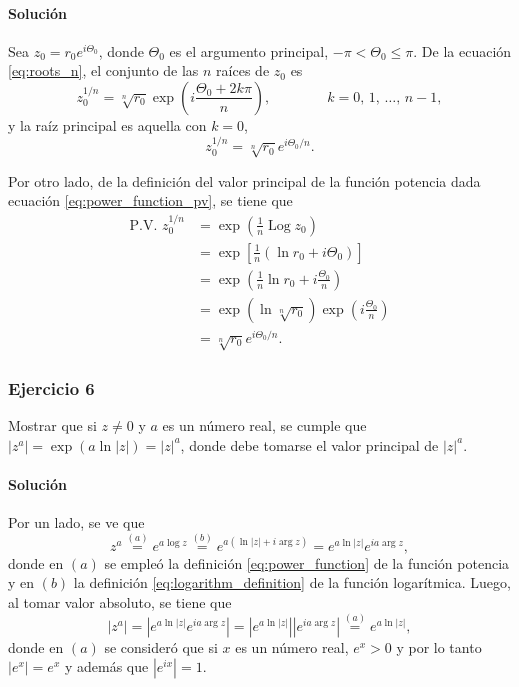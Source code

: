 \documentclass[a4paper]{report}
\DeclareMathOperator{\Log}{Log}
\begin{document}
\paragraph{Solución} Sea \(z_0=r_0e^{i\Theta_0}\), donde \(\Theta_0\) es el argumento principal, \(-\pi<\Theta_0\leq\pi\). De la ecuación \ref{eq:roots_n}, el conjunto de las \(n\) raíces de \(z_0\) es
\[
 z_0^{1/n}=\sqrt[n]{r_0}\exp\left(i\frac{\Theta_0+2k\pi}{n}\right),
 \qquad\qquad k=0,\,1,\,\dots,\,n-1,
\]
y la raíz principal es aquella con \(k=0\),
\[
 z_0^{1/n}=\sqrt[n]{r_0}e^{i\Theta_0/n}.
\]

Por otro lado, de la definición del valor principal de la función potencia dada ecuación \ref{eq:power_function_pv}, se tiene que
\begin{align*}
 \textrm{P.V. }z_0^{1/n}&=\exp\left(\frac{1}{n}\Log z_0\right)\\
  &=\exp\left[\frac{1}{n}(\ln r_0+i\Theta_0)\right]\\
  &=\exp\left(\frac{1}{n}\ln r_0+i\frac{\Theta_0}{n}\right)\\
  &=\exp\left(\ln\sqrt[n]{r_0}\right)\exp\left(i\frac{\Theta_0}{n}\right)\\
  &=\sqrt[n]{r_0}e^{i\Theta_0/n}.
\end{align*}

\subsubsection{Ejercicio 6}

Mostrar que si \(z\neq0\) y \(a\) es un número real, se cumple que \(|z^a|=\exp(a\ln|z|)=|z|^a\), donde debe tomarse el valor principal de \(|z|^a\).

\paragraph{Solución} Por un lado, se ve que 
\begin{equation}\label{eq:exercise_36_06_4}
  z^a\overset{(a)}{=}e^{a\log z}\overset{(b)}{=}e^{a(\ln|z|+i\arg z)}=e^{a\ln|z|}e^{ia\arg z},
\end{equation}
donde en \((a)\) se empleó la definición \ref{eq:power_function} de la función potencia y en \((b)\) la definición \ref{eq:logarithm_definition} de la función logarítmica. Luego, al tomar valor absoluto, se tiene que 
\begin{equation}\label{eq:exercise_36_06_1}
  |z^a|=|e^{a\ln|z|}e^{ia\arg z}|=|e^{a\ln|z|}||e^{ia\arg z}|\overset{(a)}{=}e^{a\ln|z|},
\end{equation}
donde en \((a)\) se consideró que si \(x\) es un número real, \(e^x>0\) y por lo tanto \(|e^x|=e^x\) y además que \(|e^{ix}|=1\).
\end{document}
